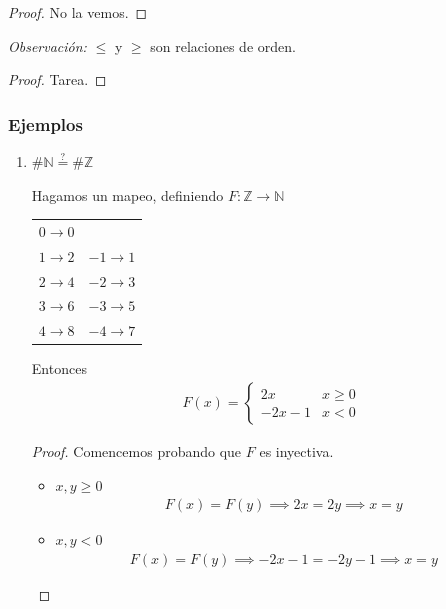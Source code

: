 \begin{proof}
    No la vemos. %
\end{proof}

\bigskip
\textit{Observación:} 
$\leq$ y $\geq$ son relaciones de orden.
%

\begin{proof} Tarea. \end{proof}


\subsubsection{Ejemplos}

\begin{enumerate}
    \item \( \# \mathbb{N} \overset{?}{=} \# \mathbb{Z} \)

Hagamos un mapeo, definiendo $F: \mathbb{Z} \to \mathbb{N}$
\begin{center}
    \begin{tabular}{c @{\hskip 1cm} c}
        $0 \to 0$ & \phantom{.} \\
        $1 \to 2$ & $-1 \to 1$ \\
        $2 \to 4$ & $-2 \to 3$ \\
        $3 \to 6$ & $-3 \to 5$ \\
        $4 \to 8$ & $-4 \to 7$
    \end{tabular}
\end{center}

Entonces 
\begin{gather*}
    F(x) = \begin{cases}
        2x & x \geq 0 \\
        -2x-1 & x < 0
    \end{cases}
\end{gather*}

\begin{proof}\phantom{.}

Comencemos probando que $F$ es inyectiva.
\begin{itemize}
    \item $x, y \geq 0$
        \begin{gather*}
            F(x) = F(y) \implies 2x = 2y \implies x = y
        \end{gather*}

    \item $x,y < 0$
        \begin{gather*}
            F(x) = F(y) \implies -2x-1 = -2y - 1 \implies x=y
        \end{gather*}


\end{itemize}
\end{proof}
\end{enumerate}
